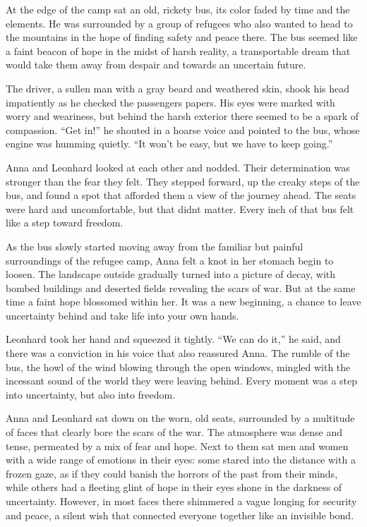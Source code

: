 \documentclass[
]{article}
\begin{document}
At the edge of the camp sat an old, rickety bus, its color faded by time
and the elements. He was surrounded by a group of refugees who also
wanted to head to the mountains in the hope of finding safety and peace
there. The bus seemed like a faint beacon of hope in the midst of harsh
reality, a transportable dream that would take them away from despair
and towards an uncertain future.

The driver, a sullen man with a gray beard and weathered skin, shook his
head impatiently as he checked the passengers\textquotesingle{} papers.
His eyes were marked with worry and weariness, but behind the harsh
exterior there seemed to be a spark of compassion. ``Get in!'' he
shouted in a hoarse voice and pointed to the bus, whose engine was
humming quietly. ``It won't be easy, but we have to keep going.''

Anna and Leonhard looked at each other and nodded. Their determination
was stronger than the fear they felt. They stepped forward, up the
creaky steps of the bus, and found a spot that afforded them a view of
the journey ahead. The seats were hard and uncomfortable, but that
didn\textquotesingle t matter. Every inch of that bus felt like a step
toward freedom.

As the bus slowly started moving away from the familiar but painful
surroundings of the refugee camp, Anna felt a knot in her stomach begin
to loosen. The landscape outside gradually turned into a picture of
decay, with bombed buildings and deserted fields revealing the scars of
war. But at the same time a faint hope blossomed within her. It was a
new beginning, a chance to leave uncertainty behind and take life into
your own hands.

Leonhard took her hand and squeezed it tightly. ``We can do it,'' he
said, and there was a conviction in his voice that also reassured Anna.
The rumble of the bus, the howl of the wind blowing through the open
windows, mingled with the incessant sound of the world they were leaving
behind. Every moment was a step into uncertainty, but also into freedom.

Anna and Leonhard sat down on the worn, old seats, surrounded by a
multitude of faces that clearly bore the scars of the war. The
atmosphere was dense and tense, permeated by a mix of fear and hope.
Next to them sat men and women with a wide range of emotions in their
eyes: some stared into the distance with a frozen gaze, as if they could
banish the horrors of the past from their minds, while others had a
fleeting glint of hope in their eyes shone in the darkness of
uncertainty. However, in most faces there shimmered a vague longing for
security and peace, a silent wish that connected everyone together like
an invisible bond.
\end{document}
